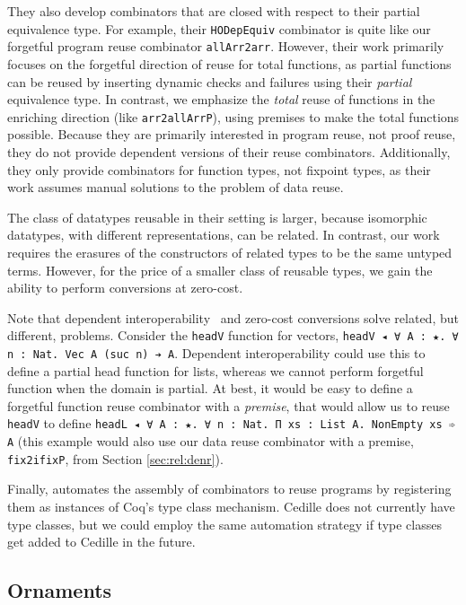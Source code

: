 \documentclass[acmsmall,screen]{acmart}
\newcommand{\refsec}[1]{Section \ref{sec:#1}}
\begin{document}
They also develop combinators that are closed with respect to their
partial equivalence type. For example, their \verb;HODepEquiv; combinator is
quite like our forgetful program reuse combinator
\verb;allArr2arr;. However, their work primarily focuses on the
forgetful direction of reuse for total functions, as partial functions
can be reused by inserting dynamic checks and failures using their
\textit{partial} equivalence type. In contrast, we emphasize the
\textit{total} reuse of functions in the enriching direction (like
\verb;arr2allArrP;), using premises to make the total functions
possible. Because they are primarily interested in program reuse, not
proof reuse, they do not provide dependent versions of their reuse
combinators. Additionally, they only provide combinators for function
types, not fixpoint types, as their work assumes manual solutions to
the problem of data reuse.

The class of datatypes reusable in their setting is larger, because
isomorphic datatypes, with different representations, can be
related. In contrast, our work requires the erasures of the
constructors of related types to be the same untyped terms. However,
for the price of a smaller class of reusable types, we gain the
ability to perform conversions at zero-cost.

Note that dependent interoperability~\cite{dagand:interopfoundations}
and zero-cost conversions solve
related, but different, problems. Consider the \verb;headV; function
for vectors, \texttt{headV ◂ ∀ A : ★. ∀ n : Nat. Vec A (suc n) ➔ A}.
Dependent interoperability could use this to define a partial head
function for lists, whereas we cannot perform forgetful function
when the domain is partial. At best, it would be easy to define a
forgetful function reuse combinator with a \textit{premise}, that would allow
us to reuse \verb;headV; to define
\verb;headL ◂ ∀ A : ★. ∀ n : Nat. Π xs : List A. NonEmpty xs ➾ A;
(this example would also use our data reuse combinator with a premise,
\verb;fix2ifixP;, from \refsec{rel:denr}).

Finally, \citet{dagand:interop} automates the assembly of combinators
to reuse programs by registering them as instances of Coq's type
class mechanism. Cedille does not currently have type classes, but we could
employ the same automation strategy if type classes get added to
Cedille in the future.

\subsection{Ornaments}
\end{document}
